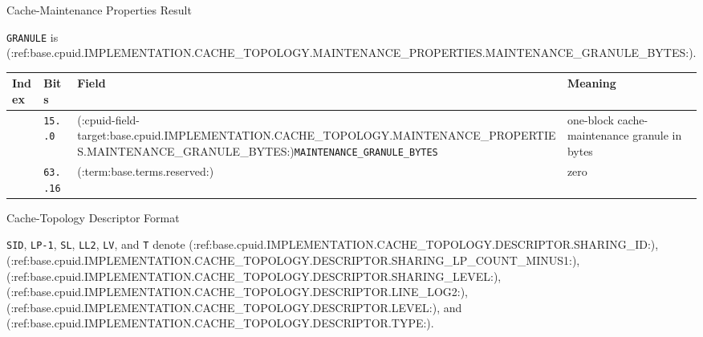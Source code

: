 \begin{BedrockListedFormatDiagram}{Cache-Maintenance Properties Result}
\end{BedrockListedFormatDiagram}
{\small\texttt{GRANULE} is (:ref:base.cpuid.IMPLEMENTATION.CACHE_TOPOLOGY.MAINTENANCE_PROPERTIES.MAINTENANCE_GRANULE_BYTES:).\par}

\Needspace{1.25in}
\begingroup\footnotesize
\setlength{\aboverulesep}{0pt}
\setlength{\belowrulesep}{0pt}
\setlength{\extrarowheight}{1.2pt}
\begin{center}
\begin{tabularx}{\linewidth}{@{}>{\raggedright\arraybackslash}p{0.45in}>{\raggedright\arraybackslash}p{0.65in}>{\raggedright\arraybackslash}p{2.20in}>{\raggedright\arraybackslash}X@{}}
\toprule
\rowcolor{BedrockHeaderFill}
\textbf{Index} & \textbf{Bits} & \textbf{Field} & \textbf{Meaning}\\
\midrule
1 & \texttt{15..0} & (:cpuid-field-target:base.cpuid.IMPLEMENTATION.CACHE_TOPOLOGY.MAINTENANCE_PROPERTIES.MAINTENANCE_GRANULE_BYTES:)\texttt{MAINTENANCE\_GRANULE\_BYTES} & one-block cache-maintenance granule in bytes\\
1 & \texttt{63..16} & (:term:base.terms.reserved:) & zero\\
\bottomrule
\end{tabularx}
\end{center}
\endgroup


\begin{BedrockListedFormatDiagram}{Cache-Topology Descriptor Format}
\end{BedrockListedFormatDiagram}
{\small\texttt{SID}, \texttt{LP-1}, \texttt{SL}, \texttt{LL2}, \texttt{LV}, and \texttt{T} denote (:ref:base.cpuid.IMPLEMENTATION.CACHE_TOPOLOGY.DESCRIPTOR.SHARING_ID:), (:ref:base.cpuid.IMPLEMENTATION.CACHE_TOPOLOGY.DESCRIPTOR.SHARING_LP_COUNT_MINUS1:), (:ref:base.cpuid.IMPLEMENTATION.CACHE_TOPOLOGY.DESCRIPTOR.SHARING_LEVEL:), (:ref:base.cpuid.IMPLEMENTATION.CACHE_TOPOLOGY.DESCRIPTOR.LINE_LOG2:), (:ref:base.cpuid.IMPLEMENTATION.CACHE_TOPOLOGY.DESCRIPTOR.LEVEL:), and (:ref:base.cpuid.IMPLEMENTATION.CACHE_TOPOLOGY.DESCRIPTOR.TYPE:).\par}

